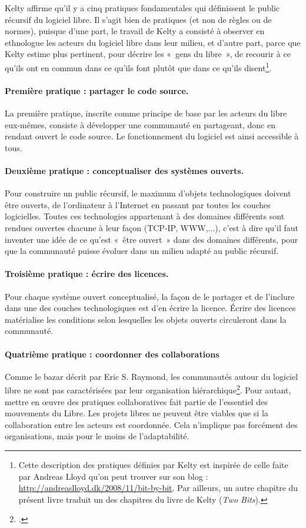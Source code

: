 \documentclass{FramateX}
\begin{document}
\begin{refsection}
Kelty affirme qu'il y a cinq pratiques fondamentales
qui définissent le public récursif du logiciel libre. Il
s'agit bien de pratiques (et non de règles ou de
normes), puisque d'une part, le travail de Kelty a
consisté à observer en ethnologue les acteurs du logiciel libre dans
leur milieu, et d'autre part, parce que Kelty estime
plus pertinent, pour décrire les «~gens du libre~», de recourir à ce
qu'ils ont en commun dans ce qu'ils
font plutôt que dans ce qu'ils disent\footnote{Cette
description des pratiques définies par Kelty est inspirée de celle faite
par Andreas Lloyd qu'on peut trouver sur son blog :
\url{http://andreaslloyd.dk/2008/11/bit-by-bit}. Par ailleurs,
un autre chapitre du présent livre traduit un des chapitres du livre de
Kelty (\textit{Two Bits}).}.

\paragraph{Première pratique : partager le code source.} La première pratique, inscrite comme principe de base par les acteurs du libre eux-mêmes, consiste à développer une communauté en partageant, donc en rendant ouvert le code source. Le fonctionnement du logiciel est ainsi accessible à tous.

\paragraph{Deuxième pratique : conceptualiser des systèmes ouverts.} Pour construire un public récursif, le maximum d'objets
technologiques doivent être ouverts, de l'ordinateur à
l'Internet en passant par toutes les couches
logicielles. Toutes ces technologies appartenant à des domaines
différents sont rendues ouvertes chacune à leur façon (TCP-IP,
WWW,...), c'est à dire qu'il faut
inventer une idée de ce qu'est «~être ouvert~» dans
des domaines différents, pour que la communauté puisse évoluer dans un
milieu adapté au public récursif.

\paragraph{Troisième pratique : écrire des licences.} Pour chaque système ouvert conceptualisé, la façon de le partager et de
l'inclure dans une des couches technologiques est
d'en écrire la licence. Écrire des licences
matérialise les conditions selon lesquelles les objets ouverts
circuleront dans la communauté.

\paragraph{Quatrième pratique : coordonner des collaborations}
Comme le bazar décrit par Eric S. Raymond, les communautés autour du
logiciel libre ne sont pas caractérisées par leur organisation
hiérarchique\footnote{\cite{raymondcathedral2001}.}. Pour
autant, mettre en œuvre des pratiques collaboratives fait partie de
l'essentiel des mouvements du Libre. Les projets
libres ne peuvent être viables que si la collaboration entre les
acteurs est coordonnée. Cela n'implique pas forcément
des organisations, mais pour le moins de
l'adaptabilité.


\end{refsection}
\end{document}
